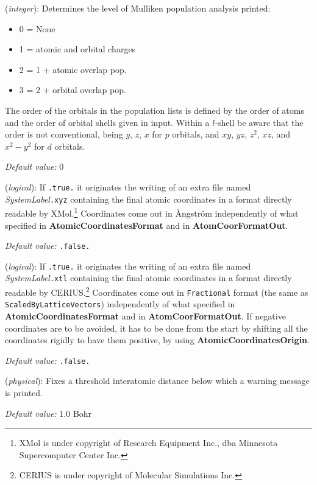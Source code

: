 \begin{description}
\itemsep 10pt
\parsep 0pt


\item[{\bf WriteMullikenPop}] ({\it integer}): 
Determines the level of Mulliken population analysis printed:
\begin{itemize}
\item 0 = None
\item 1 = atomic and orbital charges
\item 2 = 1 + atomic overlap pop.
\item 3 = 2 + orbital overlap pop.
\end{itemize}
The order of the orbitals in the population lists is defined
by the order of atoms and the order of orbital shells given in
input. Within a $l$-shell be aware that the order is not
conventional, being $y$, $z$, $x$ for $p$ orbitals, and
$xy$, $yz$, $z^2$, $xz$, and $x^2-y^2$ for $d$ orbitals.


{\it Default value:} 0


\item[{\bf WriteCoorXmol}] ({\it logical}):
If {\tt .true.} it originates the writing of an extra file
named {\it SystemLabel}{\tt .xyz} containing the final atomic
coordinates in a format directly readable by XMol.\footnote{XMol
is under copyright of Research Equipment Inc., dba Minnesota
Supercomputer Center Inc.} Coordinates come out in {\AA}ngstr\"om
independently of what specified in {\bf AtomicCoordinatesFormat} and
in {\bf AtomCoorFormatOut}.

{\it Default value:} {\tt .false.}
        

\item[{\bf WriteCoorCerius}] ({\it logical}):
If {\tt .true.} it originates the writing of an extra file
named {\it SystemLabel}{\tt .xtl} containing the final atomic
coordinates in a format directly readable by CERIUS.\footnote{CERIUS
is under copyright of Molecular Simulations Inc.} Coordinates come out in 
{\tt Fractional} format (the same as {\tt ScaledByLatticeVectors})
independently of what specified in {\bf AtomicCoordinatesFormat} and
in {\bf AtomCoorFormatOut}.
If negative coordinates are to be avoided, it has to be 
done from the start by shifting all the coordinates rigidly
to have them positive, by using {\bf AtomicCoordinatesOrigin}.

{\it Default value:} {\tt .false.}


\item[{\bf WarningMinimumAtomicDistance}] ({\it physical}):
Fixes a threshold interatomic distance below which a warning
message is printed.

{\it Default value:} 1.0 Bohr

        
\end{description}




